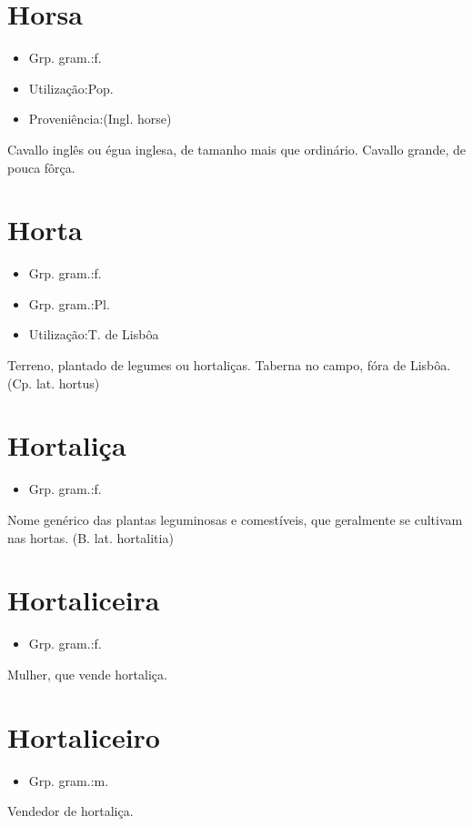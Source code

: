 \documentclass{article}
\begin{document}
\section{Horsa}
\begin{itemize}
\item {Grp. gram.:f.}
\end{itemize}
\begin{itemize}
\item {Utilização:Pop.}
\end{itemize}
\begin{itemize}
\item {Proveniência:(Ingl. \textunderscore horse\textunderscore )}
\end{itemize}
Cavallo inglês ou égua inglesa, de tamanho mais que ordinário.
Cavallo grande, de pouca fôrça.
\section{Horta}
\begin{itemize}
\item {Grp. gram.:f.}
\end{itemize}
\begin{itemize}
\item {Grp. gram.:Pl.}
\end{itemize}
\begin{itemize}
\item {Utilização:T. de Lisbôa}
\end{itemize}
Terreno, plantado de legumes ou hortaliças.
Taberna no campo, fóra de Lisbôa.
(Cp. lat. \textunderscore hortus\textunderscore )
\section{Hortaliça}
\begin{itemize}
\item {Grp. gram.:f.}
\end{itemize}
Nome genérico das plantas leguminosas e comestíveis, que geralmente se cultivam nas hortas.
(B. lat. \textunderscore hortalitia\textunderscore )
\section{Hortaliceira}
\begin{itemize}
\item {Grp. gram.:f.}
\end{itemize}
Mulher, que vende hortaliça.
\section{Hortaliceiro}
\begin{itemize}
\item {Grp. gram.:m.}
\end{itemize}
Vendedor de hortaliça.
\end{document}
